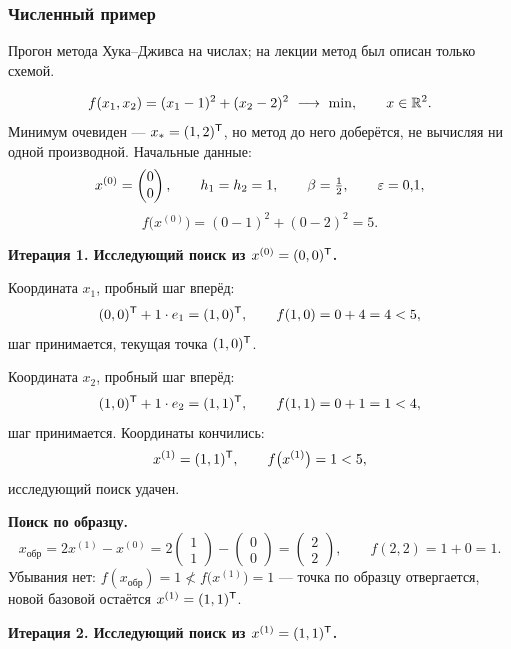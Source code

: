 \subsubsection*{Численный пример}

\begin{idea}[title={Откуда этот материал}]
Прогон метода Хука--Дживса на числах; на лекции метод был описан только
схемой.
\end{idea}

\begin{example}\label{ex:hooke-jeeves}
\[
  f(x_1, x_2) = (x_1 - 1)^2 + (x_2 - 2)^2 \ \longrightarrow\ \min ,
  \qquad x \in \R^2 .
\]
Минимум очевиден — $x_* = (1, 2)^{\mathsf{T}}$, но метод до него доберётся, не вычисляя ни
одной производной. Начальные данные:
\[
  x^{(0)} = \begin{pmatrix} 0 \\ 0 \end{pmatrix} , \qquad
  h_1 = h_2 = 1 , \qquad \beta = \tfrac12 , \qquad \varepsilon = 0{,}1 ,
\]
\[
  f\big(x^{(0)}\big) = (0-1)^2 + (0-2)^2 = 5 .
\]

\medskip
\noindent\textbf{Итерация 1. Исследующий поиск из $x^{(0)} = (0,0)^{\mathsf{T}}$.}

Координата $x_1$, пробный шаг вперёд:
\[
  (0,0)^{\mathsf{T}} + 1\cdot e_1 = (1,0)^{\mathsf{T}} , \qquad f(1,0) = 0 + 4 = 4 < 5 ,
\]
шаг принимается, текущая точка $(1,0)^{\mathsf{T}}$.

Координата $x_2$, пробный шаг вперёд:
\[
  (1,0)^{\mathsf{T}} + 1\cdot e_2 = (1,1)^{\mathsf{T}} , \qquad f(1,1) = 0 + 1 = 1 < 4 ,
\]
шаг принимается. Координаты кончились:
\[
  x^{(1)} = (1,1)^{\mathsf{T}} , \qquad f\big(x^{(1)}\big) = 1 < 5 ,
\]
исследующий поиск удачен.

\medskip
\noindent\textbf{Поиск по образцу.}
\[
  x_{\text{обр}} = 2x^{(1)} - x^{(0)} = 2\begin{pmatrix} 1 \\ 1 \end{pmatrix}
    - \begin{pmatrix} 0 \\ 0 \end{pmatrix}
    = \begin{pmatrix} 2 \\ 2 \end{pmatrix} ,
  \qquad
  f(2,2) = 1 + 0 = 1 .
\]
Убывания нет: $f(x_{\text{обр}}) = 1 \not< f\big(x^{(1)}\big) = 1$ — точка по
образцу отвергается, новой базовой остаётся $x^{(1)} = (1,1)^{\mathsf{T}}$.

\medskip
\noindent\textbf{Итерация 2. Исследующий поиск из $x^{(1)} = (1,1)^{\mathsf{T}}$.}


\end{example}
